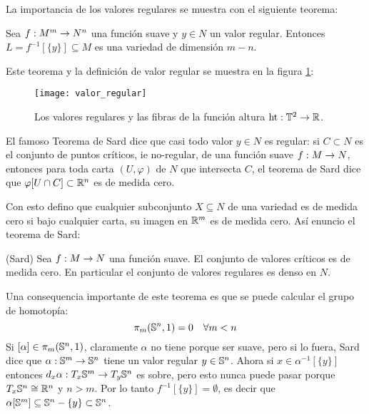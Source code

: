 \documentclass[../../topologia_algebraica]{subfiles}
\begin{document}
La importancia de los valores regulares se muestra con el siguiente teorema:

\begin{thm}\label{thm:imagen_inversa_valor_regular_subvariedad}
  Sea $f:M^m\rightarrow N^n$ una funci\'on suave y $y\in N$ un valor regular. Entonces
  $L=f^{-1}[\{y\}]\subseteq M$ es una variedad de dimensi\'on $m-n$.
\end{thm}

Este teorema y la definici\'on de valor regular se muestra en la figura \ref{fig:valor_regular}:

\begin{figure}[t]%
  \centering
  \label{fig:valor_regular}
  \caption{Los valores regulares y las fibras de la funci\'on altura $\text{ht}:\mathbb{T}^2\rightarrow\mathbb{R}$.}
  \texttt{[image: valor\_regular]}
\end{figure}%

El famoso Teorema de Sard dice que casi todo valor $y\in N$ es regular: si $C\subset N$ es el
conjunto de puntos cr\'iticos, ie no-regular, de una funci\'on suave $f:M\rightarrow N$,
entonces para toda carta $(U,\varphi)$ de $N$ que intersecta $C$, el teorema de Sard dice
que $\varphi[U\cap C]\subset\mathbb{R}^n$ es de medida cero.

Con esto defino que cualquier subconjunto $X\subseteq N$ de una variedad es de medida cero
si bajo cualquier carta, su imagen en $\mathbb{R}^m$ es de medida cero. As\'i enuncio el teorema
de Sard:

\begin{thm}(Sard)
  Sea $f:M\rightarrow N$ una funci\'on suave. El conjunto de valores cr\'iticos es de medida cero.
  En particular el conjunto de valores regulares es denso en $N$.
\end{thm}

Una consequencia importante de este teorema es que se puede calcular el grupo de homotop\'ia:
\begin{equation}\label{eq:pi_m<n}
  \pi_m(\mathbb{S}^n,1)=0 \quad\forall m<n
\end{equation}
Si $[\alpha]\in\pi_m(\mathbb{S}^n,1)$, claramente $\alpha$ no tiene porque ser suave, pero si lo
fuera, Sard dice que $\alpha:\mathbb{S}^m\rightarrow\mathbb{S}^n$ tiene un valor regular $y\in\mathbb{S}^n$. Ahora si
$x\in \alpha^{-1}[\{y\}]$ entonces $d_x\alpha:T_x\mathbb{S}^m\rightarrow T_y\mathbb{S}^n$ es sobre, pero esto
nunca puede pasar porque $T_x\mathbb{S}^n\cong\mathbb{R}^n$ y $n>m$. Por lo tanto $f^{-1}[\{y\}]=\emptyset$,
es decir que $\alpha[\mathbb{S}^m]\subseteq \mathbb{S}^n-\{y\}\subset\mathbb{S}^n$.
\end{document}
